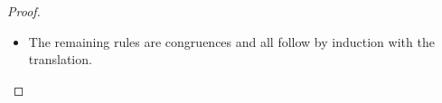 \begin{proof}
\begin{itemize}
\begin{align*}
\begin{array}{rl}
        & \equiv_L  \SYSTEMsym{(}   \mathsf{let} \, \textcolor{coeffectColor}{[}  \SYSTEMmv{x}  \textcolor{coeffectColor}{]} =   \textcolor{GLcolor}{\llbracket}  \SYSTEMnt{t_{{\mathrm{1}}}}  \textcolor{GLcolor}{\rrbracket}   \, \mathsf{in} \,   \textcolor{coeffectColor}{[}    \textcolor{GLcolor}{\llbracket}  \SYSTEMnt{t_{{\mathrm{2}}}}  \textcolor{GLcolor}{\rrbracket}    \textcolor{coeffectColor}{]}    \SYSTEMsym{)} \,   \textcolor{GLcolor}{\llbracket}  \SYSTEMnt{t_{{\mathrm{0}}}}  \textcolor{GLcolor}{\rrbracket}   \\
   \textit{\{\SYSTEMRenameRuleLinEqletCommTwo{}\}}
        & \equiv_L   \mathsf{let} \, \textcolor{coeffectColor}{[}  \SYSTEMmv{x}  \textcolor{coeffectColor}{]} =   \textcolor{GLcolor}{\llbracket}  \SYSTEMnt{t_{{\mathrm{1}}}}  \textcolor{GLcolor}{\rrbracket}   \, \mathsf{in} \,   \textcolor{GLcolor}{\llbracket}  \SYSTEMnt{t_{{\mathrm{2}}}}  \textcolor{GLcolor}{\rrbracket}   \,   \textcolor{coeffectColor}{[}    \textcolor{GLcolor}{\llbracket}  \SYSTEMnt{t_{{\mathrm{0}}}}  \textcolor{GLcolor}{\rrbracket}    \textcolor{coeffectColor}{]}   \\
   \textit{\{defn. translation}\}
        & =  \textcolor{GLcolor}{\llbracket}    \mathsf{let} \, \textcolor{coeffectColor}{[}  \SYSTEMmv{x}  \textcolor{coeffectColor}{]} =  \SYSTEMnt{t_{{\mathrm{1}}}}  \, \mathsf{in} \,  \SYSTEMnt{t_{{\mathrm{2}}}}  \,  \SYSTEMnt{t_{{\mathrm{0}}}}   \textcolor{GLcolor}{\rrbracket} 
      \end{array}
      \end{align*}

    \item The remaining rules are congruences and all follow by induction with
    the translation.
  \end{itemize}
\end{proof}
